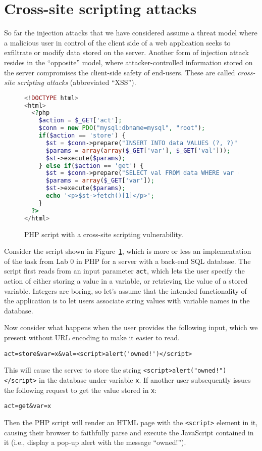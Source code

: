 \documentclass[11pt,twoside]{scrartcl}
\begin{document}
\section{Cross-site scripting attacks}

So far the injection attacks that we have considered assume a threat model where a malicious user in control of the client side of a web application seeks to exfiltrate or modify data stored on the server. Another form of injection attack resides in the ``opposite'' model, where attacker-controlled information stored on the server compromises the client-side safety of end-users. These are called \emph{cross-site scripting attacks} (abbreviated ``XSS'').

\begin{figure}
\begin{lstlisting}[language=PHP]
<!DOCTYPE html>
<html>
  <?php 
    $action = $_GET['act'];
    $conn = new PDO("mysql:dbname=mysql", "root");
    if($action == 'store') {
      $st = $conn->prepare("INSERT INTO data VALUES (?, ?)");
      $params = array(array($_GET['var'], $_GET['val']));
      $st->execute($params);
    } else if($action == 'get') {
      $st = $conn->prepare("SELECT val FROM data WHERE var = ?");
      $params = array($_GET['var']);
      $st->execute($params);
      echo '<p>$st->fetch()[1]</p>';
    }
  ?>
</html>
\end{lstlisting}

\caption{\label{fig:injection3} PHP script with a cross-site scripting vulnerability.}
\end{figure}

Consider the script shown in Figure~\ref{fig:injection3}, which is more or less an implementation of the task from Lab 0 in PHP for a server with a back-end SQL database. The script first reads from an input parameter \verb'act', which lets the user specify the action of either storing a value in a variable, or retrieving the value of a stored variable. Integers are boring, so let's assume that the intended functionality of the application is to let users associate string values with variable names in the database.

Now consider what happens when the user provides the following input, which we present without URL encoding to make it easier to read.
\begin{verbatim}
act=store&var=x&val=<script>alert('owned!')</script>
\end{verbatim}
This will cause the server to store the string \verb'<script>alert("owned!")</script>' in the database under variable \verb'x'. If another user subsequently issues the following request to get the value stored in \verb'x':
\begin{verbatim}
act=get&var=x
\end{verbatim}
Then the PHP script will render an HTML page with the \verb'<script>' element in it, causing their browser to faithfully parse and execute the JavaScript contained in it (i.e., display a pop-up alert with the message ``owned!'').
\end{document}
